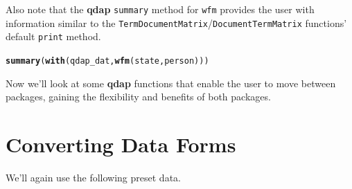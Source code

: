 \documentclass{article}\usepackage[]{graphicx}\usepackage[]{color}
\makeatletter
\newcommand{\hlstd}[1]{\textcolor[rgb]{0.345,0.345,0.345}{#1}}%
\newcommand{\hlkwd}[1]{\textcolor[rgb]{0.737,0.353,0.396}{\textbf{#1}}}%
\newenvironment{kframe}{%
 \def\at@end@of@kframe{}%
 \ifinner\ifhmode%
  \def\at@end@of@kframe{\end{minipage}}%
  \begin{minipage}{\columnwidth}%
 \fi\fi%
 \def\FrameCommand##1{\hskip\@totalleftmargin \hskip-\fboxsep
 \colorbox{shadecolor}{##1}\hskip-\fboxsep
     \hskip-\linewidth \hskip-\@totalleftmargin \hskip\columnwidth}%
 \MakeFramed {\advance\hsize-\width
   \@totalleftmargin\z@ \linewidth\hsize
   \@setminipage}}%
 {\par\unskip\endMakeFramed%
 \at@end@of@kframe}
\newenvironment{knitrout}{}{} %
\makeatother
\begin{document}
Also note that the \textbf{qdap} \texttt{summary} method for \texttt{wfm} provides the user with information similar to the \texttt{TermDocumentMatrix}/\texttt{DocumentTermMatrix} functions' default \texttt{print} method.


\begin{knitrout}
\color{fgcolor}\begin{kframe}
\begin{alltt}
\hlkwd{summary}\hlstd{(}\hlkwd{with}\hlstd{(qdap_dat,} \hlkwd{wfm}\hlstd{(state, person)))}
\end{alltt}
\end{kframe}
\end{knitrout}


\begin{knitrout}
\color{fgcolor}\begin{kframe}


{\ttfamily\noindent\itshape\color{messagecolor}{\#\# A word-frequency matrix (16 terms, 5 groups)\\\#\# \\\#\# \\\#\# Non-/sparse entries\ \ \ \ \ \  : 17/63\\\#\# Sparsity\ \ \ \ \ \ \ \ \ \ \ \ \ \ \ \ \ \ : 79\%\\\#\# Maximal term length\ \ \ \ \ \  : 8\\\#\# Less than four characters : 56\%\\\#\# Hapax legomenon\ \ \ \ \ \ \ \ \ \  : 13(81\%)\\\#\# Dis legomenon\ \ \ \ \ \ \ \ \ \ \ \  : 3(19\%)\\\#\# Shannon's diversity index : 2.73}}\end{kframe}
\end{knitrout}


Now we'll look at some \textbf{qdap} functions that enable the user to move between packages, gaining the flexibility and benefits of both packages.


\section{Converting Data Forms}

We'll again use the following preset data.
\end{document}
